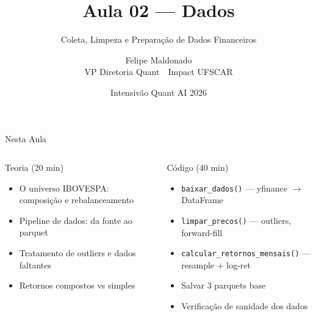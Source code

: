 \documentclass[aspectratio=169,12pt]{beamer}
\author{Felipe Maldonado\\{\scriptsize VP Diretoria Quant~\textbullet{}~Impact UFSCAR}}
\date{Intensivão Quant AI 2026}
\title{Aula 02 --- Dados}
\subtitle{Coleta, Limpeza e Preparação de Dados Financeiros}
\begin{document}
\begin{frame}[plain]
\titlepage
\end{frame}

\begin{frame}[fragile]{Nesta Aula}
\begin{columns}[T]
\begin{block}{Teoria (20 min)}
\begin{itemize}
  \item O universo IBOVESPA: composição e rebalanceamento
  \item Pipeline de dados: da fonte ao parquet
  \item Tratamento de outliers e dados faltantes
  \item Retornos compostos vs simples
\end{itemize}
\end{block}
\begin{block}{Código (40 min)}
\begin{itemize}
  \item \texttt{baixar\_dados()} — yfinance $\to$ DataFrame
  \item \texttt{limpar\_precos()} — outliers, forward-fill
  \item \texttt{calcular\_retornos\_mensais()} — resample + log-ret
  \item Salvar 3 parquets base
  \item Verificação de sanidade dos dados
\end{itemize}
\end{block}
\end{columns}
\end{frame}
\end{document}
